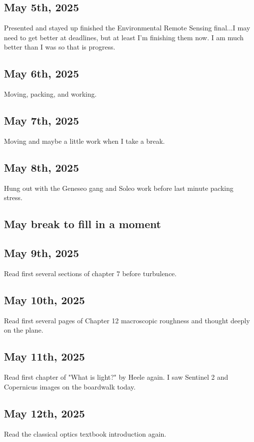 \documentclass{article}
\begin{document}
\subsection{May 5th, 2025}
Presented and stayed up finished the Environmental Remote Sensing final...I may need to get better at deadlines, but at least I'm finishing them now. I am much better than I was so that is progress. 



\subsection{May 6th, 2025}
Moving, packing, and working. 


\subsection{May 7th, 2025}
Moving and maybe a little work when I take a break. 



\subsection{May 8th, 2025}
Hung out with the Geneseo gang and Soleo work before last minute packing stress. 
\subsection{May break to fill in a moment}


\subsection{May 9th, 2025}
Read first several sections of chapter 7 before turbulence.

\subsection{May 10th, 2025}
Read first several pages of Chapter 12 macroscopic roughness and thought deeply on the plane.

\subsection{May 11th, 2025}
Read first chapter of "What is light?" by Heele again. I saw Sentinel 2 and Copernicus images on the boardwalk today.
\subsection{May 12th, 2025}
Read the classical optics textbook introduction again.
\end{document}
